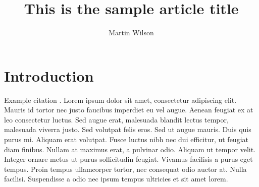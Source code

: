 \documentclass[AMA,STIX2COL,Linenumberson]{MRM}
\begin{document}
\title{This is the sample article title}

\author[1]{Martin Wilson}{}


\address[]{, , }






\maketitle

\section{Introduction}\label{intro}

Example citation \cite{wilson_robust_2019}. Lorem ipsum dolor sit amet, consectetur adipiscing elit. Mauris id tortor nec justo faucibus imperdiet eu vel augue. Aenean feugiat ex at leo consectetur luctus. Sed augue erat, malesuada blandit lectus tempor, malesuada viverra justo. Sed volutpat felis eros. Sed ut augue mauris. Duis quis purus mi. Aliquam erat volutpat. Fusce luctus nibh nec dui efficitur, ut feugiat diam finibus. Nullam at maximus erat, a pulvinar odio. Aliquam ut tempor velit. Integer ornare metus ut purus sollicitudin feugiat. Vivamus facilisis a purus eget tempus. Proin tempus ullamcorper tortor, nec consequat odio auctor at. Nulla facilisi. Suspendisse a odio nec ipsum tempus ultricies et sit amet lorem.
\end{document}
